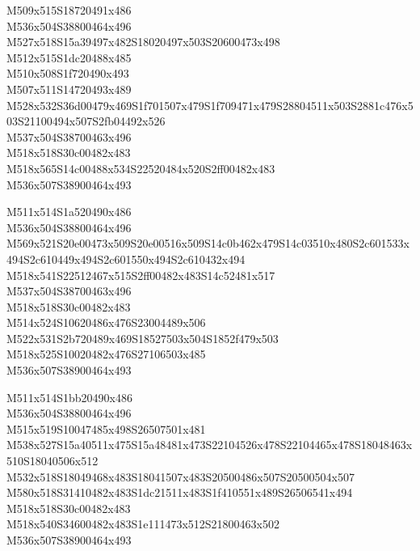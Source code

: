 \documentclass{article}
\begin{document}
\begin{multicols}{5}
\begin{center}

M509x515S18720491x486 %
\\M536x504S38800464x496 %
\\M527x518S15a39497x482S18020497x503S20600473x498 %
\\M512x515S1dc20488x485 %
\\M510x508S1f720490x493 %
\\M507x511S14720493x489 %
\\M528x532S36d00479x469S1f701507x479S1f709471x479S28804511x503S2881c476x503S21100494x507S2fb04492x526 %
\\M537x504S38700463x496 %
\\M518x518S30c00482x483 %
\\M518x565S14c00488x534S22520484x520S2ff00482x483 %
\\M536x507S38900464x493 %
\vfil
\columnbreak

M511x514S1a520490x486 %
\\M536x504S38800464x496 %
\\M569x521S20e00473x509S20e00516x509S14c0b462x479S14c03510x480S2c601533x494S2c610449x494S2c601550x494S2c610432x494 %
\\M518x541S22512467x515S2ff00482x483S14c52481x517 %
\\M537x504S38700463x496 %
\\M518x518S30c00482x483 %
\\M514x524S10620486x476S23004489x506 %
\\M522x531S2b720489x469S18527503x504S1852f479x503 %
\\M518x525S10020482x476S27106503x485 %
\\M536x507S38900464x493 %
\vfil
\columnbreak

M511x514S1bb20490x486 %
\\M536x504S38800464x496 %
\\M515x519S10047485x498S26507501x481 %
\\M538x527S15a40511x475S15a48481x473S22104526x478S22104465x478S18048463x510S18040506x512 %
\\M532x518S18049468x483S18041507x483S20500486x507S20500504x507 %
\\M580x518S31410482x483S1dc21511x483S1f410551x489S26506541x494 %
\\M518x518S30c00482x483 %
\\M518x540S34600482x483S1e111473x512S21800463x502 %
\\M536x507S38900464x493 %
\vfil
\columnbreak


\end{center}
\end{multicols}
\end{document}
